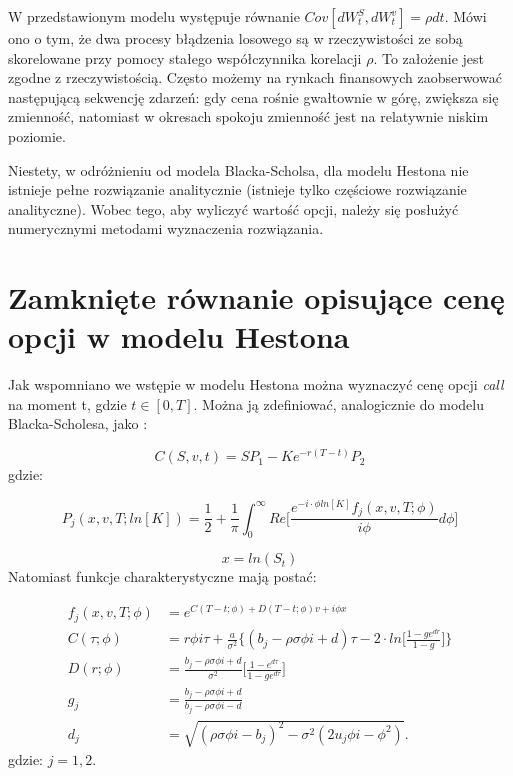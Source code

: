 \documentclass{pracamgr}
\begin{document}
W przedstawionym modelu występuje równanie $Cov[dW^S_t, dW^v_t] = \rho dt $. Mówi ono o tym, że 
dwa procesy błądzenia losowego są w rzeczywistości ze sobą skorelowane przy pomocy stałego współczynnika 
korelacji $\rho$.
To założenie jest zgodne z rzeczywistością. Często możemy na rynkach finansowych zaobserwować następującą sekwencję zdarzeń: gdy cena rośnie gwałtownie w górę, zwiększa się zmienność, 
natomiast w okresach spokoju zmienność jest na relatywnie niskim poziomie.

Niestety, w odróżnieniu od modela Blacka-Scholsa, dla modelu Hestona nie istnieje pełne rozwiązanie analitycznie (istnieje tylko częściowe rozwiązanie analityczne). Wobec tego, aby 
wyliczyć wartość opcji, należy się posłużyć numerycznymi metodami wyznaczenia rozwiązania.


\section{Zamknięte równanie opisujące cenę opcji w modelu Hestona}



Jak wspomniano we wstępie w modelu Hestona można wyznaczyć cenę opcji \textit{call} na moment t, gdzie $t \in [0, T]$. Można ją zdefiniować, analogicznie do modelu Blacka-Scholesa, jako \cite{Heston}:

\begin{equation}
  C(S, v, t) = SP_1 -K e^{-r(T-t)} P_2
\end{equation}
gdzie:

\begin{equation}
\label{eq:HestonProb}
  P_j (x, v, T; ln[K]) = \frac{1}{2} + \frac{1}{\pi} \int_{0}^{\infty} Re \bigg[ \frac{e^{-i \cdot \phi ln[K]} f_j(x, v, T; \phi) }{i \phi} d \phi \bigg]
\end{equation}

\begin{equation}
  x = ln(S_t)
\end{equation}
Natomiast funkcje charakterystyczne mają postać: 

\begin{equation}
\label{eq:HestonCharacteristic}
  \begin{aligned}
f_j(x, v, T; \phi) &= e^{C(T-t; \phi) + D(T-t; \phi)v + i \phi x} \\
C (\tau; \phi)     &= r \phi i \tau + \frac{a}{\sigma^2} \bigg\{ (b_j - \rho \sigma \phi i + d) \tau - 2 \cdot ln \bigg[ \frac{1 - ge^{dr}}{1-g} \bigg] \bigg\} \\
D (r; \phi)        &= \frac{b_j- \rho \sigma \phi i + d}{\sigma^2} \bigg[ \frac{1 - e^{d\tau}}{1 - ge^{d\tau}} \bigg]   \\
g_j                &= \frac{b_j - \rho \sigma \phi i + d}{b_j - \rho \sigma \phi i - d} \\
d_j                &= \sqrt{(\rho \sigma \phi i  - b_j)^2 - \sigma^2(2 u_j \phi  i  - \phi^2)}.
  \end{aligned}
\end{equation}
gdzie: $j = 1,2$.
\end{document}
